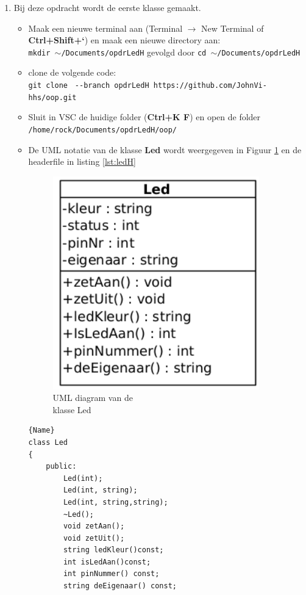 \begin{enumerate}
\item Bij deze opdracht wordt de eerste klasse gemaakt.
\begin{itemize}
	\item Maak een nieuwe terminal aan (Terminal $\rightarrow$ New Terminal of \textbf{Ctrl+Shift+`}) en maak een nieuwe directory aan:\\ \texttt{mkdir $\sim$/Documents/opdrLedH} gevolgd door \texttt{cd $\sim$/Documents/opdrLedH}
	\item clone de volgende code:\\
	 {\small \texttt{git clone } \verb|--|\texttt{branch opdrLedH https://github.com/JohnVi-hhs/oop.git}}
	 \item Sluit in VSC de huidige folder (\textbf{Ctrl+K F}) en open de folder\\ \texttt{/home/rock/Documents/opdrLedH/oop/}
	\item De UML notatie van de klasse \textbf{Led} wordt weergegeven in Figuur \ref{fig:klassLed} en de headerfile in listing \ref{lst:ledH}

	\begin{minipage}{0.5\textwidth} 
	\begin{figure}[H]
		\includegraphics[width=0.9\textwidth]{figuren/klasseLedOpg1}
		\caption{UML diagram van de \\klasse Led}
		\label{fig:klassLed}   
	\end{figure}
\end{minipage}\hfill
\begin{minipage}{.45\textwidth}
	\begin{lstlisting}[caption=LED declaratie file(.h),frame=tlrb,label={lst:ledH}]{Name}
class Led
{
	public:
    	Led(int);
		Led(int, string);
		Led(int, string,string);
		~Led();
		void zetAan();
		void zetUit();
		string ledKleur()const;
		int isLedAan()const;
		int pinNummer() const;
		string deEigenaar() const;
			

\end{lstlisting}
\end{minipage}
\end{itemize}
\end{enumerate}

